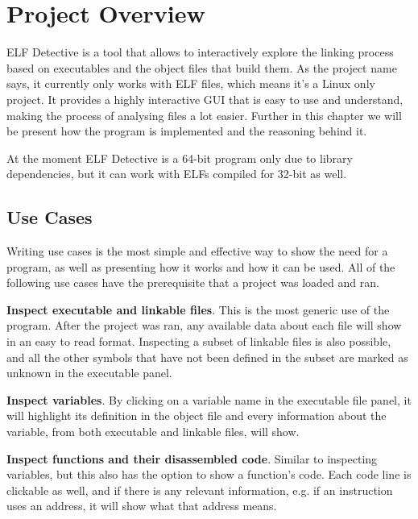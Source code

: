 
\chapter{Project Overview}
\label{chapter:proj-overview}

ELF Detective is a tool that allows to interactively explore the linking process based on executables and the object files that build them. As the project name says, it currently only works with ELF files, which means it's a Linux only project. It provides a highly interactive GUI that is easy to use and understand, making the process of analysing files a lot easier. Further in this chapter we will be present how the program is implemented and the reasoning behind it.

At the moment ELF Detective is a 64-{}bit program only due to library dependencies, but it can work with ELFs compiled for 32-{}bit as well.


\section{Use Cases}
\label{sec:use-cases}

Writing use cases is the most simple and effective way to show the need for a program, as well as presenting how it works and how it can be used. All of the following use cases have the prerequisite that a project was loaded and ran. 

\textbf{Inspect executable and linkable files}. This is the most generic use of the program. After the project was ran, any available data about each file will show in an easy to read format. Inspecting a subset of linkable files is also possible, and all the other symbols that have not been defined in the subset are marked as unknown in the executable panel.

\textbf{Inspect variables}. By clicking on a variable name in the executable file panel, it will highlight its definition in the object file and every information about the variable, from both executable and linkable files, will show. 

\textbf{Inspect functions and their disassembled code}. Similar to inspecting variables, but this also has the option to show a function's code. Each code line is clickable as well, and if there is any relevant information, e.g. if an instruction uses an address, it will show what that address means. 

